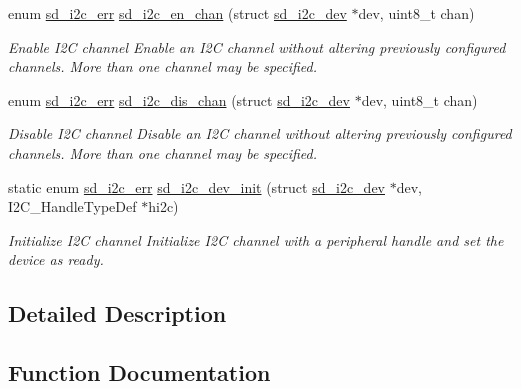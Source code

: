 \begin{DoxyCompactItemize}
enum \mbox{\hyperlink{group___s_d___i2_c___types_gae1e3131e61bdef08371262ffb4948a04}{sd\+\_\+i2c\+\_\+err}} \mbox{\hyperlink{group___s_d___i2_c___functions_gae53676ec67141159567ef4b5b5aadb2e}{sd\+\_\+i2c\+\_\+en\+\_\+chan}} (struct \mbox{\hyperlink{structsd__i2c__dev}{sd\+\_\+i2c\+\_\+dev}} $\ast$dev, uint8\+\_\+t chan)
\begin{DoxyCompactList}\small\item\em Enable I2C channel Enable an I2C channel without altering previously configured channels. More than one channel may be specified. \end{DoxyCompactList}\item 
enum \mbox{\hyperlink{group___s_d___i2_c___types_gae1e3131e61bdef08371262ffb4948a04}{sd\+\_\+i2c\+\_\+err}} \mbox{\hyperlink{group___s_d___i2_c___functions_ga813c9280ce6745a2e55bccc9d562cd54}{sd\+\_\+i2c\+\_\+dis\+\_\+chan}} (struct \mbox{\hyperlink{structsd__i2c__dev}{sd\+\_\+i2c\+\_\+dev}} $\ast$dev, uint8\+\_\+t chan)
\begin{DoxyCompactList}\small\item\em Disable I2C channel Disable an I2C channel without altering previously configured channels. More than one channel may be specified. \end{DoxyCompactList}\item 
static enum \mbox{\hyperlink{group___s_d___i2_c___types_gae1e3131e61bdef08371262ffb4948a04}{sd\+\_\+i2c\+\_\+err}} \mbox{\hyperlink{group___s_d___i2_c___functions_ga5ca9adea5de20505761f892603bf8805}{sd\+\_\+i2c\+\_\+dev\+\_\+init}} (struct \mbox{\hyperlink{structsd__i2c__dev}{sd\+\_\+i2c\+\_\+dev}} $\ast$dev, I2\+C\+\_\+\+Handle\+Type\+Def $\ast$hi2c)
\begin{DoxyCompactList}\small\item\em Initialize I2C channel Initialize I2C channel with a peripheral handle and set the device as ready. \end{DoxyCompactList}\end{DoxyCompactItemize}


\subsection{Detailed Description}


\subsection{Function Documentation}
\mbox{\label{group___s_d___i2_c___functions_gabe01a202c27b23fc150aa66af3130073}} 
